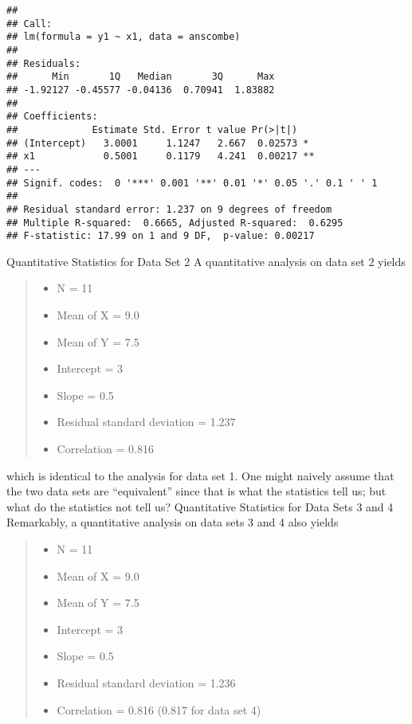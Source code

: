 \documentclass[]{book}
\providecommand{\tightlist}{%
  \setlength{\itemsep}{0pt}\setlength{\parskip}{0pt}}
\theoremstyle{definition}
\theoremstyle{definition}
\theoremstyle{definition}
\theoremstyle{remark}
\begin{document}
\begin{verbatim}
## 
## Call:
## lm(formula = y1 ~ x1, data = anscombe)
## 
## Residuals:
##      Min       1Q   Median       3Q      Max 
## -1.92127 -0.45577 -0.04136  0.70941  1.83882 
## 
## Coefficients:
##             Estimate Std. Error t value Pr(>|t|)   
## (Intercept)   3.0001     1.1247   2.667  0.02573 * 
## x1            0.5001     0.1179   4.241  0.00217 **
## ---
## Signif. codes:  0 '***' 0.001 '**' 0.01 '*' 0.05 '.' 0.1 ' ' 1
## 
## Residual standard error: 1.237 on 9 degrees of freedom
## Multiple R-squared:  0.6665, Adjusted R-squared:  0.6295 
## F-statistic: 17.99 on 1 and 9 DF,  p-value: 0.00217
\end{verbatim}

Quantitative Statistics for Data Set 2 A quantitative analysis on data
set 2 yields

\begin{quote}
\begin{itemize}
\tightlist
\item
  N = 11
\item
  Mean of X = 9.0
\item
  Mean of Y = 7.5
\item
  Intercept = 3
\item
  Slope = 0.5
\item
  Residual standard deviation = 1.237
\item
  Correlation = 0.816
\end{itemize}
\end{quote}

which is identical to the analysis for data set 1. One might naively
assume that the two data sets are ``equivalent'' since that is what the
statistics tell us; but what do the statistics not tell us? Quantitative
Statistics for Data Sets 3 and 4 Remarkably, a quantitative analysis on
data sets 3 and 4 also yields

\begin{quote}
\begin{itemize}
\tightlist
\item
  N = 11
\item
  Mean of X = 9.0
\item
  Mean of Y = 7.5
\item
  Intercept = 3
\item
  Slope = 0.5
\item
  Residual standard deviation = 1.236
\item
  Correlation = 0.816 (0.817 for data set 4)
\end{itemize}
\end{quote}
\end{document}
